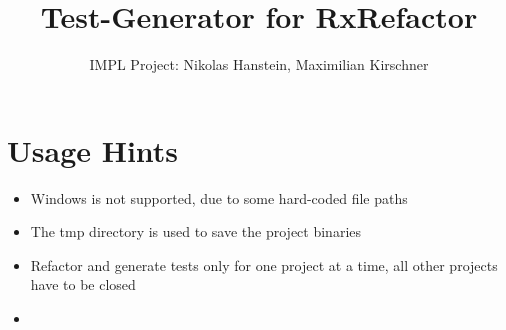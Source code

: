 \documentclass[accentcolor=tud9c, colorback]{tudreport}
\title{Test-Generator for RxRefactor}
\subtitle{IMPL Project: Nikolas Hanstein, Maximilian Kirschner}
\begin{document}
	\maketitle
	
	\tableofcontents
	
	\chapter{Usage Hints}
		\begin{itemize}
			\item Windows is not supported, due to some hard-coded file paths
			\item The tmp directory is used to save the project binaries
			\item Refactor and generate tests only for one project at a time, all other projects have to be closed
			\item
			
		\end{itemize}
\end{document}
